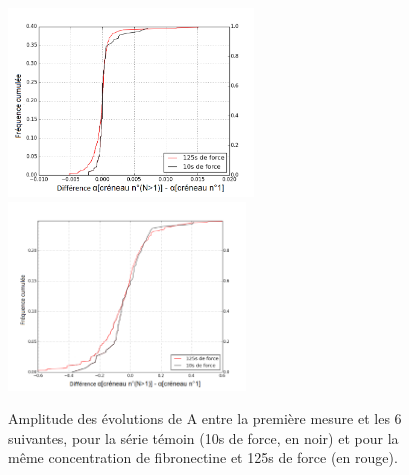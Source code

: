 \documentclass                                                                                                                                                                                                                                                                                                                                       {report}
\begin{document}
\begin{figure}[p]
\includegraphics[height=5cm]{Figures/A_diff_seul.png} 
\includegraphics[height=5cm]{Figures/E_diff_seul.png}
\caption{Amplitude des évolutions de A entre la première mesure et les 6 suivantes, pour la série témoin (10s de force, en noir) et pour la même concentration de fibronectine et 125s de force (en rouge).}
\label{Diff}
\end{figure}
\end{document}
